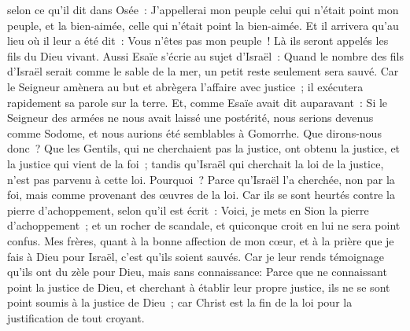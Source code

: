 \begin{multicols}{2}
selon ce qu'il dit dans Osée~: J'appellerai mon peuple celui qui n'était point mon peuple, et la bien-aimée, celle qui n'était point la bien-aimée.
Et il arrivera qu'au lieu où il leur a été dit~: Vous n'êtes pas mon peuple~! Là ils seront appelés les fils du Dieu vivant.
Aussi Esaïe s'écrie au sujet d'Israël~: Quand le nombre des fils d'Israël serait comme le sable de la mer, un petit reste seulement sera sauvé.
Car le Seigneur amènera au but et abrègera l'affaire avec justice~; il exécutera rapidement sa parole sur la terre.
Et, comme Esaïe avait dit auparavant~: Si le Seigneur des armées ne nous avait laissé une postérité, nous serions devenus comme Sodome, et nous aurions été semblables à Gomorrhe.
Que dirons-nous donc~? Que les Gentils, qui ne cherchaient pas la justice, ont obtenu la justice, et la justice qui vient de la foi~;
tandis qu'Israël qui cherchait la loi de la justice, n'est pas parvenu à cette loi.
Pourquoi~? Parce qu'Israël l'a cherchée, non par la foi, mais comme provenant des œuvres de la loi. Car ils se sont heurtés contre la pierre d'achoppement,
selon qu'il est écrit~: Voici, je mets en Sion la pierre d'achoppement~; et un rocher de scandale, et quiconque croit en lui ne sera point confus.
\VerseOne{}Mes frères, quant à la bonne affection de mon cœur, et à la prière que je fais à Dieu pour Israël, c'est qu'ils soient sauvés.
Car je leur rends témoignage qu'ils ont du zèle pour Dieu, mais sans connaissance:
Parce que ne connaissant point la justice de Dieu, et cherchant à établir leur propre justice, ils ne se sont point soumis à la justice de Dieu~;
car Christ est la fin de la loi pour la justification de tout croyant.

\end{multicols}
